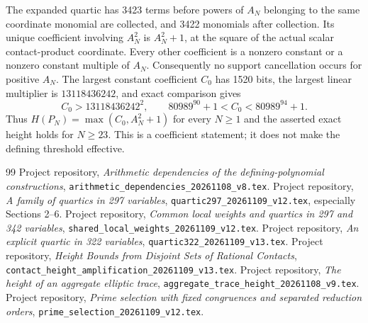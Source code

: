 \documentclass[11pt,a4paper]{article}
\begin{document}
The expanded quartic has 3423 terms before powers of $A_N$ belonging
to the same coordinate monomial are collected, and 3422 monomials
after collection. Its unique coefficient involving $A_N^2$ is
$A_N^2+1$, at the square of the actual scalar contact-product coordinate.
Every other coefficient is a nonzero constant or a nonzero constant
multiple of $A_N$. Consequently no support cancellation occurs for
positive $A_N$. The largest constant coefficient $C_0$ has 1520 bits,
the largest linear multiplier is $13118436242$, and exact comparison
gives
\[
 C_0>13118436242^2,\qquad
 80989^{90}+1<C_0<80989^{94}+1.
\]
Thus $H(P_N)=\max(C_0,A_N^2+1)$ for every $N\ge1$ and the asserted
exact height holds for $N\ge23$. This is a coefficient statement;
it does not make the defining threshold effective.

\begin{thebibliography}{99}
 Project repository,
\emph{Arithmetic dependencies of the defining-polynomial constructions},
\nolinkurl{arithmetic_dependencies_20261108_v8.tex}.
 Project repository,
\emph{A family of quartics in 297 variables},
\nolinkurl{quartic297_20261109_v12.tex}, especially Sections 2--6.
 Project repository,
\emph{Common local weights and quartics in 297 and 342 variables},
\nolinkurl{shared_local_weights_20261109_v12.tex}.
 Project repository,
\emph{An explicit quartic in 322 variables},
\nolinkurl{quartic322_20261109_v13.tex}.
 Project repository,
\emph{Height Bounds from Disjoint Sets of Rational Contacts},
\nolinkurl{contact_height_amplification_20261109_v13.tex}.
 Project repository,
\emph{The height of an aggregate elliptic trace},
\nolinkurl{aggregate_trace_height_20261108_v9.tex}.
 Project repository,
\emph{Prime selection with fixed congruences and separated reduction orders},
\nolinkurl{prime_selection_20261109_v12.tex}.
\end{thebibliography}
\end{document}
